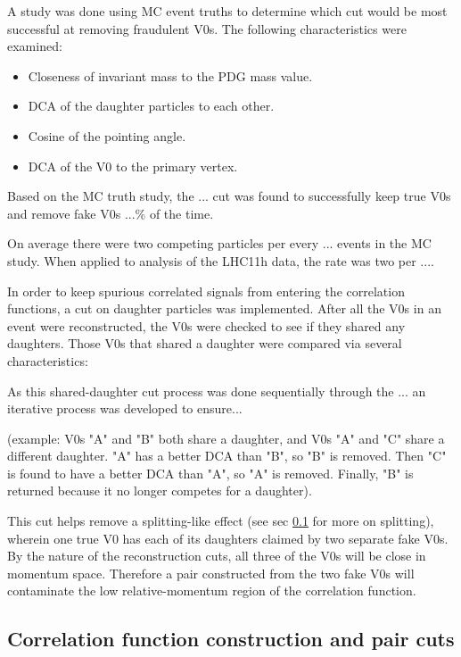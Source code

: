 A study was done using MC event truths to determine which cut would be most successful at removing fraudulent V0s.  The following characteristics were examined:

\begin{itemize}
\item Closeness of invariant mass to the PDG mass value.
\item DCA of the daughter particles to each other.
\item Cosine of the pointing angle.
\item DCA of the V0 to the primary vertex.
\end{itemize}

Based on the MC truth study, the ... cut was found to successfully keep true V0s and remove fake V0s ...\% of the time.  

On average there were two competing particles per every ... events in the MC study.  When applied to analysis of the LHC11h data, the rate was two per ....

In order to keep spurious correlated signals from entering the correlation functions, a cut on daughter particles was implemented.  After all the V0s in an event were reconstructed, the V0s were checked to see if they shared any daughters.  Those V0s that shared a daughter were compared via several characteristics:

As this shared-daughter cut process was done sequentially through the ... an iterative process was developed to ensure... 

(example: V0s "A" and "B" both share a daughter, and V0s "A" and "C" share a different daughter.  "A" has a better DCA than "B", so "B" is removed.  Then "C" is found to have a better DCA than "A", so "A" is removed.  Finally, "B" is returned because it no longer competes for a daughter).

This cut helps remove a splitting-like effect (see sec \ref{sec:CFconstruct} for more on splitting), wherein one true V0 has each of its daughters claimed by two separate fake V0s.  By the nature of the reconstruction cuts, all three of the V0s will be close in momentum space.  Therefore a pair constructed from the two fake V0s will contaminate the low relative-momentum region of the correlation function.  


\subsection{Correlation function construction and pair cuts}
\label{sec:CFconstruct}

